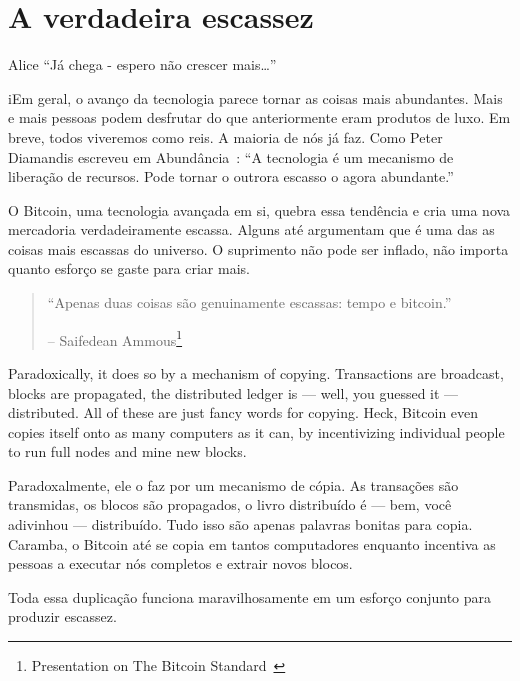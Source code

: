 
\chapter{A verdadeira escassez}
\label{les:2}

\begin{chapquote}{Alice}
\enquote{Já chega - espero não crescer mais\ldots}
\end{chapquote}

iEm geral, o avanço da tecnologia parece tornar as coisas mais abundantes. Mais
e mais pessoas podem desfrutar do que anteriormente eram produtos de luxo.
Em breve, todos viveremos como reis. A maioria de nós já faz. Como Peter Diamandis
escreveu em Abundância~\cite{abundance}: \enquote{A tecnologia é um mecanismo de liberação de recursos. 
Pode tornar o outrora escasso o agora abundante.}

O Bitcoin, uma tecnologia avançada em si, quebra essa tendência e cria
uma nova mercadoria verdadeiramente escassa. Alguns até argumentam que é uma das
as coisas mais escassas do universo. O suprimento não pode ser inflado, 
não importa quanto esforço se gaste para criar mais.


\begin{quotation}\begin{samepage}
\enquote{Apenas duas coisas são genuinamente escassas: tempo e bitcoin.}
\begin{flushright} -- Saifedean Ammous\footnote{Presentation on The Bitcoin Standard~\cite{bitcoinstandard-pres}}
\end{flushright}\end{samepage}\end{quotation}

Paradoxically, it does so by a mechanism of copying. Transactions are
broadcast, blocks are propagated, the distributed ledger is --- well,
you guessed it --- distributed. All of these are just fancy words for
copying. Heck, Bitcoin even copies itself onto as many computers as it
can, by incentivizing individual people to run full nodes and mine new
blocks.

Paradoxalmente, ele o faz por um mecanismo de cópia. As transações são
transmidas, os blocos são propagados, o livro distribuído é --- bem,
você adivinhou --- distribuído. Tudo isso são apenas palavras bonitas para
copia. Caramba, o Bitcoin até se copia em tantos computadores enquanto
incentiva as pessoas a executar nós completos e extrair novos
blocos.

Toda essa duplicação funciona maravilhosamente em um esforço conjunto
para produzir escassez.

